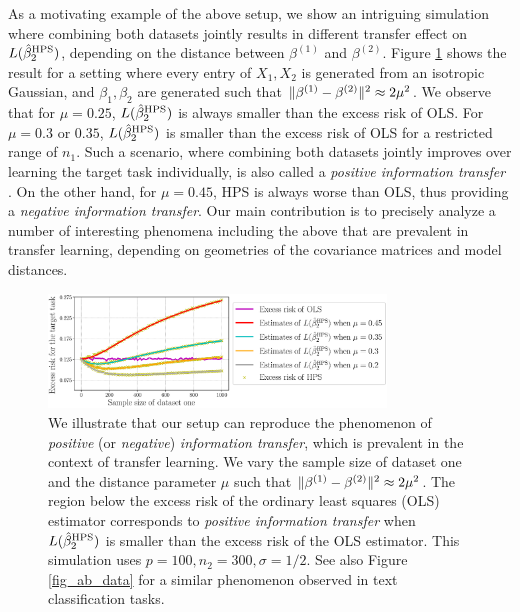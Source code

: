 As a motivating example of the above setup, we show an intriguing simulation where combining both datasets jointly results in different transfer effect on $L(\hat{\beta}_2^{\textup{HPS}})$, depending on the distance between $\beta^{(1)}$ and $\beta^{(2)}$.
Figure \ref{fig_motivation} shows the result for a setting where every entry of $X_1, X_2$ is generated from an isotropic Gaussian, and $\beta_1,\beta_2$ are generated such that $\|\beta^{(1)} - \beta^{(2)}\|^2 \approx 2\mu^2$.
We observe that for $\mu = 0.25$, $L(\hat{\beta}_2^{\textup{HPS}})$ is always smaller than the excess risk of OLS.
For $\mu = 0.3$ or $0.35$, $L(\hat{\beta}_2^{\textup{HPS}})$ is smaller than the excess risk of OLS for a restricted range of $n_1$.
Such a scenario, where combining both datasets jointly improves over learning the target task individually, is also called a \textit{positive information transfer} \cite{PY09}.
On the other hand, for $\mu = 0.45$, HPS is always worse than OLS, thus providing a \textit{negative information transfer}.  
Our main contribution is to precisely analyze a number of interesting phenomena including the above that are prevalent in transfer learning, depending on geometries of the covariance matrices and model distances. 


\begin{figure}
    \centering
    \includegraphics[width=0.8\textwidth]{figures/motivation.eps}
    \caption{We illustrate that our setup can reproduce the phenomenon of \textit{positive} (or \textit{negative}) \textit{information transfer}, which is prevalent in the context of transfer learning.
    We vary the sample size of dataset one and the distance parameter $\mu$ such that $\|\beta^{(1)} - \beta^{(2)}\|^2 \approx 2\mu^2$. The region below the excess risk of the ordinary least squares (OLS) estimator corresponds to \textit{positive information transfer} when $L(\hat{\beta}_2^{\textup{HPS}})$ is smaller than the excess risk of the OLS estimator. This simulation uses $p = 100, n_2 = 300, \sigma = 1/2$. See also Figure \ref{fig_ab_data} for a similar phenomenon observed in text classification tasks.}
    \label{fig_motivation}
\end{figure}

